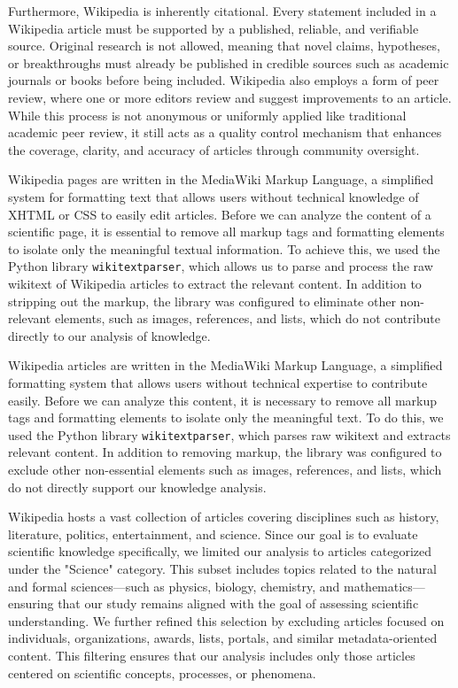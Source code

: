Furthermore, Wikipedia is inherently citational. Every statement included in a Wikipedia article must be supported by a published, reliable, and verifiable source. Original research is not allowed, meaning that novel claims, hypotheses, or breakthroughs must already be published in credible sources such as academic journals or books before being included. Wikipedia also employs a form of peer review, where one or more editors review and suggest improvements to an article. While this process is not anonymous or uniformly applied like traditional academic peer review, it still acts as a quality control mechanism that enhances the coverage, clarity, and accuracy of articles through community oversight.

Wikipedia pages are written in the MediaWiki Markup Language, a simplified system for formatting text that allows users without technical knowledge of XHTML or CSS to easily edit articles. Before we can analyze the content of a scientific page, it is essential to remove all markup tags and formatting elements to isolate only the meaningful textual information.  To achieve this, we used the Python library \texttt{wikitextparser}, which allows us to parse and process the raw wikitext of Wikipedia articles to extract the relevant content. In addition to stripping out the markup, the library was configured to eliminate other non-relevant elements, such as images, references, and lists, which do not contribute directly to our analysis of knowledge.

Wikipedia articles are written in the MediaWiki Markup Language, a simplified formatting system that allows users without technical expertise to contribute easily. Before we can analyze this content, it is necessary to remove all markup tags and formatting elements to isolate only the meaningful text. To do this, we used the Python library \texttt{wikitextparser}, which parses raw wikitext and extracts relevant content. In addition to removing markup, the library was configured to exclude other non-essential elements such as images, references, and lists, which do not directly support our knowledge analysis.

Wikipedia hosts a vast collection of articles covering disciplines such as history, literature, politics, entertainment, and science. Since our goal is to evaluate scientific knowledge specifically, we limited our analysis to articles categorized under the "Science" category. This subset includes topics related to the natural and formal sciences—such as physics, biology, chemistry, and mathematics—ensuring that our study remains aligned with the goal of assessing scientific understanding. We further refined this selection by excluding articles focused on individuals, organizations, awards, lists, portals, and similar metadata-oriented content. This filtering ensures that our analysis includes only those articles centered on scientific concepts, processes, or phenomena.

